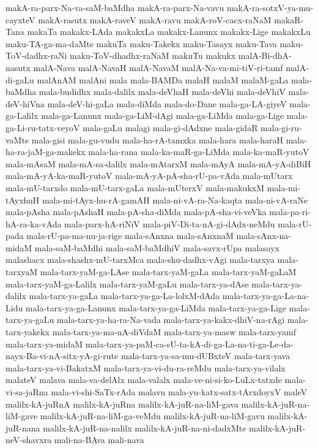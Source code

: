 {makA-ra-parx-Na-va-saM-baMdha
makA-ra-parx-Na-vavu
makA-ra-sotxV-ya-mu-cayxteV
makA-rasutx
makA-raveV
makA-ravu
makA-roV-cacx-raNaM
makaR-Tana
makaTa
makakx-LAda
makakxLa
makakx-Lanunx
makakx-Lige
makakxLu
maku-TA-ga-ma-daMte
makuTa
maku-Takekx
maku-Tasayx
maku-Tava
maku-ToV-dadhx-raNi
maku-ToV-dhadhx-raNaM
makuTu
makukx
malA-Bi-dhA-nasutx
malA-Nava
malA-NavaH
malA-NavaM
malA-Na-va-mi-tiV-ri-tamf
malA-di-gaLu
malAnAM
malAni
mala
mala-BAMDa
malaH
malaM
malaM-gaLa
mala-baMdha
mala-budidhx
mala-dalilx
mala-deVhaH
mala-deVhi
mala-deVhiV
mala-deV-hiVna
mala-deV-hi-gaLa
mala-diMda
mala-do-Dane
mala-ga-LA-giyeV
mala-ga-Lalilx
mala-ga-Lanunx
mala-ga-LiM-dAgi
mala-ga-LiMda
mala-ga-Lige
mala-ga-Li-ru-tatx-veyoV
mala-gaLu
malagi
mala-gi-dAdxne
mala-gidaR
mala-gi-ru-vaMte
mala-gisi
mala-gu-vudu
mala-ha-rA-tamxka
mala-hara
mala-haraH
mala-ha-ra-jaM-ga-makekx
mala-ha-rana
mala-ka-maR-ga-LiMda
mala-ka-maR-yutoV
mala-mAsaM
mala-mA-sa-dalilx
mala-mAtarxM
mala-mAyA
mala-mA-yA-diBiH
mala-mA-yA-ka-maR-yutoV
mala-mA-yA-pA-sha-rU-pa-vAda
mala-mUtarx
mala-mU-tarxdo
mala-mU-tarx-gaLa
mala-mUterxV
mala-makukxM
mala-mi-tAyxhuH
mala-mi-tAyx-hu-rA-gamAH
mala-ni-vA-ra-Na-kaqta
mala-ni-vA-raNe
mala-pAsha
mala-pAshaH
mala-pA-sha-diMda
mala-pA-sha-vi-veVka
mala-pa-ri-hA-ra-ka-vAda
mala-parx-hA-riNiV
mala-piV-Di-ta-nA-gi-dAdx-neMdu
mala-rU-pada
mala-rU-pa-ma-nu-ja-rige
mala-sAnxna
mala-sAnxnaM
mala-sAnx-na-midaM
mala-saM-baMdhi
mala-saM-baMdhiV
mala-savx-rUpa
malasayx
malashacx
mala-shashx-mU-tarxMca
mala-shu-dadhx-vAgi
mala-tarxya
mala-tarxyaM
mala-tarx-yaM-ga-LAse
mala-tarx-yaM-gaLa
mala-tarx-yaM-gaLaM
mala-tarx-yaM-ga-Lalilx
mala-tarx-yaM-gaLu
mala-tarx-ya-dAse
mala-tarx-ya-dalilx
mala-tarx-ya-gaLa
mala-tarx-ya-ga-La-lolxM-dAda
mala-tarx-ya-ga-La-na-Lidu
mala-tarx-ya-ga-Lanunx
mala-tarx-ya-ga-LiMda
mala-tarx-ya-ga-Lige
mala-tarx-ya-gaLu
mala-tarx-ya-ha-ra-Na-vada
mala-tarx-ya-kakx-dhiV-na-rAgi
mala-tarx-yakekx
mala-tarx-ya-ma-nA-diVdaM
mala-tarx-ya-masw
mala-tarx-yamf
mala-tarx-ya-midaM
mala-tarx-ya-paM-ca-sU-ta-kA-di-ga-La-na-ti-ga-Le-da-nayx-Ba-vi-nA-sitx-yA-gi-rute
mala-tarx-ya-sa-mu-dUBxteV
mala-tarx-yava
mala-tarx-ya-vi-BakatxM
mala-tarx-ya-vi-du-ra-reMdu
mala-tarx-ya-vilalx
malateV
malava
mala-va-delAlx
mala-valalx
mala-ve-ni-si-ko-LuLx-tatxde
mala-vi-sa-jaRna
mala-vi-shi-SaTx-rAda
malavu
mala-yu-katx-satx-tArxdoyxV
maleV
malilx-kA-juRnA
malilx-kA-juRna
malilx-kA-juR-na-liM-gava
malilx-kA-juR-na-liM-gave
malilx-kA-juR-na-liM-ga-veMdu
malilx-kA-juR-na-liM-gavu
malilx-kA-juR-nana
malilx-kA-juR-na-nalilx
malilx-kA-juR-na-ni-dadxMte
malilx-kA-juR-neV-shavxra
mali-na-BAva
mali-nava
}
